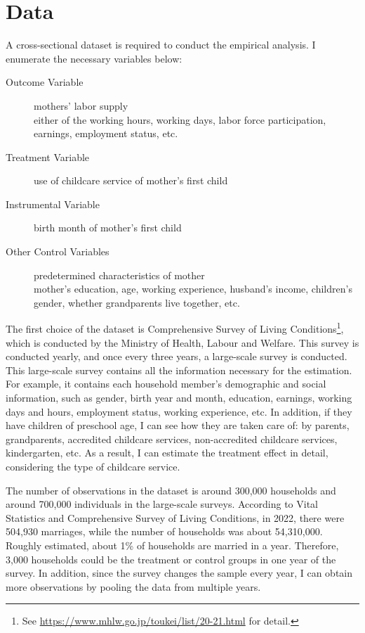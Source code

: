 \documentclass[12pt]{article}
\begin{document}
\section{Data}
A cross-sectional dataset is required to conduct the empirical analysis.
I enumerate the necessary variables below: 
\begin{description}
  \item[Outcome Variable] mothers' labor supply \\ 
  either of the working hours, working days, labor force participation, earnings, employment status, etc.
  \item[Treatment Variable] use of childcare service of mother's first child 
  \item[Instrumental Variable] birth month of mother's first child
  \item[Other Control Variables] predetermined characteristics of mother \\
  mother's education, age, working experience, husband's income, children's gender, whether grandparents live together, etc.
\end{description}
The first choice of the dataset is Comprehensive Survey of Living Conditions\footnote{See \url{https://www.mhlw.go.jp/toukei/list/20-21.html} for detail.}, which is conducted by the Ministry of Health, Labour and Welfare.
This survey is conducted yearly, and once every three years, a large-scale survey is conducted.
This large-scale survey contains all the information necessary for the estimation.
For example, it contains each household member's demographic and social information, such as gender, birth year and month, education, earnings, working days and hours, employment status, working experience, etc.
In addition, if they have children of preschool age, I can see how they are taken care of: by parents, grandparents, accredited childcare services, non-accredited childcare services, kindergarten, etc. 
As a result, I can estimate the treatment effect in detail, considering the type of childcare service.


The number of observations in the dataset is around 300,000 households and around 700,000 individuals in the large-scale surveys.
According to Vital Statistics and Comprehensive Survey of Living Conditions, in 2022, there were 504,930 marriages, while the number of households was about 54,310,000. 
Roughly estimated, about 1\% of households are married in a year.
Therefore, 3,000 households could be the treatment or control groups in one year of the survey. 
In addition, since the survey changes the sample every year, I can obtain more observations by pooling the data from multiple years.
\end{document}
